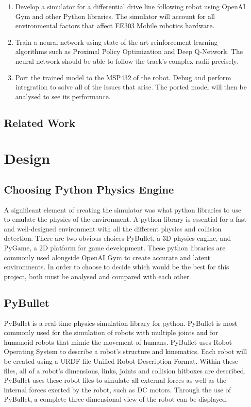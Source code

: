 \documentclass[12pt]{article}
\begin{document}
\begin{enumerate}
  \item Develop a simulator for a differential drive line following robot using OpenAI Gym and other Python libraries. The simulator will account for all environmental factors that affect EE303 Mobile robotics hardware. 

  \item Train a neural network using state-of-the-art reinforcement learning algorithms such as Proximal Policy Optimization and Deep Q-Network. The neural network should be able to follow the track's complex radii precisely.
  \item Port the trained model to the MSP432 of the robot. Debug and perform integration to solve all of the issues that arise. The ported model will then be analysed to see its performance.

\end{enumerate}

\subsection{Related Work}

\section{Design}

\subsection{Choosing Python Physics Engine}

A significant element of creating the simulator was what python libraries to use to emulate the physics of the environment. A python library is essential for a fast and well-designed environment with all the different physics and collision detection. There are two obvious choices PyBullet, a 3D physics engine, and PyGame, a 2D platform for game development. These python libraries are commonly used alongside OpenAI Gym to create accurate and latent environments. In order to choose to decide which would be the best for this project, both must be analysed and compared with each other.

\subsection{PyBullet}

PyBullet is a real-time physics simulation library for python. PyBullet is most commonly used for the simulation of robots with multiple joints and for humanoid robots that mimic the movement of humans. PyBullet uses Robot Operating System to describe a robot's structure and kinematics. Each robot will be created using a URDF file Unified Robot Description Format. Within these files, all of a robot's dimensions, links, joints and collision hitboxes are described. PyBullet uses these robot files to simulate all external forces as well as the internal forces exerted by the robot, such as DC motors. Through the use of PyBullet, a complete three-dimensional view of the robot can be displayed.
\end{document}
